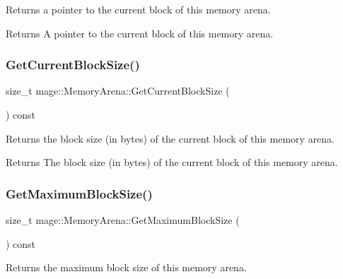 Returns a pointer to the current block of this memory arena.

\begin{DoxyReturn}{Returns}
A pointer to the current block of this memory arena. 
\end{DoxyReturn}
\mbox{\label{classmage_1_1_memory_arena_a0b41d6901c3519f046cd551931f72c1b}} 
\subsubsection{\texorpdfstring{Get\+Current\+Block\+Size()}{GetCurrentBlockSize()}}
{\footnotesize\ttfamily size\+\_\+t mage\+::\+Memory\+Arena\+::\+Get\+Current\+Block\+Size (\begin{DoxyParamCaption}{ }\end{DoxyParamCaption}) const\hspace{0.3cm}{\ttfamily [noexcept]}}

Returns the block size (in bytes) of the current block of this memory arena.

\begin{DoxyReturn}{Returns}
The block size (in bytes) of the current block of this memory arena. 
\end{DoxyReturn}
\mbox{\label{classmage_1_1_memory_arena_a6786cf52a03777580b439cafdd8ff8f9}} 
\subsubsection{\texorpdfstring{Get\+Maximum\+Block\+Size()}{GetMaximumBlockSize()}}
{\footnotesize\ttfamily size\+\_\+t mage\+::\+Memory\+Arena\+::\+Get\+Maximum\+Block\+Size (\begin{DoxyParamCaption}{ }\end{DoxyParamCaption}) const\hspace{0.3cm}{\ttfamily [noexcept]}}

Returns the maximum block size of this memory arena.

